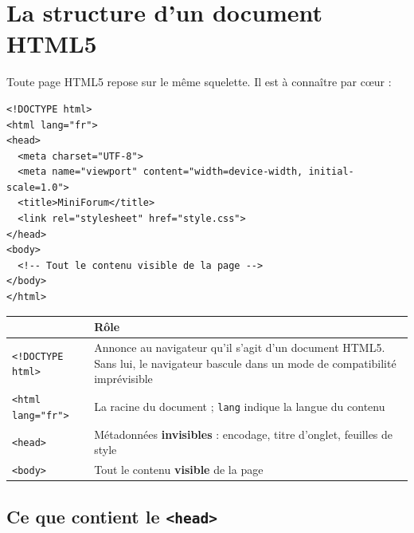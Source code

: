 \documentclass[a4paper,11pt]{article}
\newcommand{\hdr}[1]{\multicolumn{1}{l}{\color{white}\bfseries #1}}
\renewcommand{\arraystretch}{1.3}
\begin{document}
\section{La structure d'un document HTML5}

Toute page HTML5 repose sur le même squelette. Il est à connaître par c\oe ur :

\begin{lstlisting}[language=HTML5, caption={Squelette minimal d'une page HTML5}]
<!DOCTYPE html>
<html lang="fr">
<head>
  <meta charset="UTF-8">
  <meta name="viewport" content="width=device-width, initial-scale=1.0">
  <title>MiniForum</title>
  <link rel="stylesheet" href="style.css">
</head>
<body>
  <!-- Tout le contenu visible de la page -->
</body>
</html>
\end{lstlisting}

\begin{center}
\renewcommand{\arraystretch}{1.0}
\begin{tabularx}{\linewidth}{p{3.6cm}X}
  \toprule
  \rowcolor{uniNavy}
  \hdr{Élément} & \hdr{Rôle} \\
  \midrule
  \rowcolor{uniPaper}
  \texttt{<!DOCTYPE html>} & Annonce au navigateur qu'il s'agit d'un document HTML5. Sans lui, le navigateur bascule dans un mode de compatibilité imprévisible \\
  \texttt{<html lang="fr">} & La racine du document ; \texttt{lang} indique la langue du contenu \\
  \rowcolor{uniPaper}
  \texttt{<head>} & Métadonnées \textbf{invisibles} : encodage, titre d'onglet, feuilles de style \\
  \texttt{<body>} & Tout le contenu \textbf{visible} de la page \\
  \bottomrule
\end{tabularx}
\end{center}

\subsection{Ce que contient le \texttt{<head>}}
\end{document}
